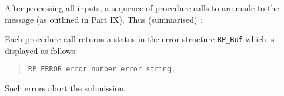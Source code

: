 After processing all inputs, a sequence of procedure calls to are made
to  the message (as outlined in Part IX).  Thus
(summarised) :

Each procedure call returns a status in the error structure
\verb+RP_Buf+ which is displayed as follows:

\begin{quote}\small\begin{verbatim}
RP_ERROR error_number error_string.
\end{verbatim}\end{quote}

Such errors abort the submission.
